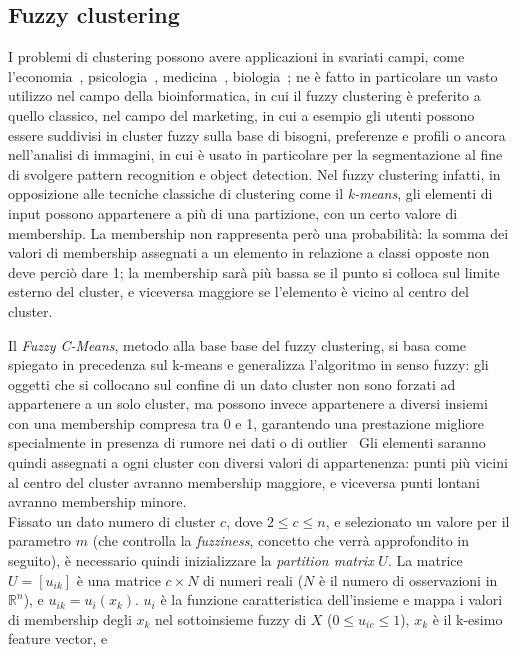 \documentclass[oneside, openany]{book}
\begin{document}
	\subsection{Fuzzy clustering}
		I problemi di clustering possono avere applicazioni in svariati campi, come l'economia~\cite{bib:economy}, psicologia~\cite{bib:psychology}, medicina~\cite{bib:medicine, bib:medicine2}, biologia~\cite{bib:biology,bib:biology2}; ne è fatto in particolare un vasto utilizzo nel campo della bioinformatica, in cui il fuzzy clustering è preferito a quello classico, nel campo del marketing, in cui a esempio gli utenti possono essere suddivisi in cluster fuzzy sulla base di bisogni, preferenze e profili o ancora nell'analisi di immagini, in cui è usato in particolare per la segmentazione al fine di svolgere pattern recognition e object detection.
		Nel fuzzy clustering infatti, in opposizione alle tecniche classiche di clustering come il \textit{k-means}, gli elementi di input possono appartenere a più di una partizione, con un certo valore di membership. La membership non rappresenta però una probabilità: la somma dei valori di membership assegnati a un elemento in relazione a classi opposte non deve perciò dare 1; la membership sarà più bassa se il punto si colloca sul limite esterno del cluster, e viceversa maggiore se l'elemento è vicino al centro del cluster.
		
		Il \textit{Fuzzy C-Means}, metodo alla base base del fuzzy clustering, si basa come spiegato in precedenza sul k-means e generalizza l'algoritmo in senso fuzzy: gli oggetti che si collocano sul confine di un dato cluster non sono forzati ad appartenere a un solo cluster, ma possono invece appartenere a diversi insiemi con una membership compresa tra 0 e 1, garantendo una prestazione migliore specialmente in presenza di rumore nei dati o di outlier~\cite{bib:kmvfcm}
		Gli elementi saranno quindi assegnati a ogni cluster con diversi valori di appartenenza: punti più vicini al centro del cluster avranno membership maggiore, e viceversa punti lontani avranno membership minore.\\
		Fissato un dato numero di cluster $c$, dove $2\leq c \le n$,  e selezionato un valore per il parametro $m$ (che controlla la \textit{fuzziness}, concetto che verrà approfondito in seguito), è necessario quindi inizializzare la \textit{partition matrix} $U$. La matrice $U=[u_{ik}]$ è una matrice $c\times N$ di numeri reali ($N$ è il numero di osservazioni in $\mathbb R^n$), e $u_{ik}=u_i(x_k)$. $u_{i}$ è la funzione caratteristica dell'insieme e mappa i valori di membership degli $x_k$ nel sottoinsieme fuzzy di $X$ ($0\leq u_{ic}\leq 1$), $x_k$ è il k-esimo feature vector, e
	
\end{document}
